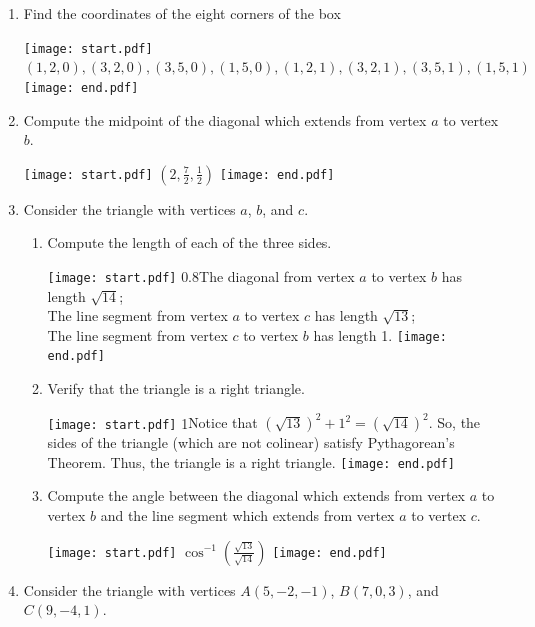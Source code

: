 \documentclass[12pt]{article}
\begin{document}
\begin{enumerate}

\item Find the coordinates of the eight corners of the box

\texttt{[image: start.pdf]}
{{$(1,2,0), (3,2,0), (3,5,0), (1,5,0), (1,2,1), (3,2,1), (3,5,1), (1,5,1)$}}
\texttt{[image: end.pdf]}


\item Compute the midpoint of the diagonal which extends from vertex $a$ to vertex $b$.

\texttt{[image: start.pdf]}
{{$\left(2,\frac{7}{2},\frac{1}{2}\right)$}}
\texttt{[image: end.pdf]}


\item Consider the triangle with vertices $a$, $b$, and $c$.

\begin{enumerate}

\item Compute the length of each of the three sides.

\texttt{[image: start.pdf]}
{{{0.8\linewidth}{The diagonal from vertex $a$ to vertex $b$ has length $\sqrt{14}$;\\
The line segment from vertex $a$ to vertex $c$ has length $\sqrt{13}$;\\
The line segment from vertex $c$ to vertex $b$ has length 1.}}}
\texttt{[image: end.pdf]}


\item Verify that the triangle is a right triangle.

\texttt{[image: start.pdf]}
{{{1\linewidth}{Notice that $\left(\sqrt{13}\right)^2+1^2=\left(\sqrt{14}\right)^2$.  So, the sides of the triangle (which are not colinear) satisfy Pythagorean's Theorem.  Thus, the triangle is a right triangle.}}}
\texttt{[image: end.pdf]}


\item Compute the angle between the diagonal which extends from vertex $a$ to vertex $b$ and the line segment which extends from vertex $a$ to vertex $c$.

\texttt{[image: start.pdf]}
{{$\cos^{-1}\left(\frac{\sqrt{13}}{\sqrt{14}}\right)$}}
\texttt{[image: end.pdf]}


\end{enumerate}

\item Consider the triangle with vertices $A(5,-2,-1)$, $B(7,0,3)$, and $C(9,-4,1)$.

\begin{enumerate}


\end{enumerate}
\end{enumerate}
\end{document}
